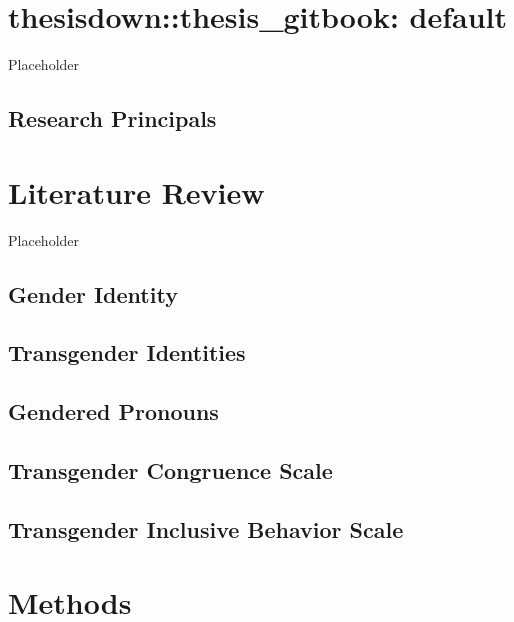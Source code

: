 \documentclass[12pt,twoside]{reedthesis}
\begin{document}
\hypertarget{thesisdownthesis_gitbook-default}{%
\chapter{thesisdown::thesis\_gitbook: default}\label{thesisdownthesis_gitbook-default}}

Placeholder

\hypertarget{research-principals}{%
\section{Research Principals}\label{research-principals}}

\hypertarget{literature-review}{%
\chapter{Literature Review}\label{literature-review}}

Placeholder

\hypertarget{gender-identity}{%
\section{Gender Identity}\label{gender-identity}}

\hypertarget{transgender-identities}{%
\section{Transgender Identities}\label{transgender-identities}}

\hypertarget{gendered-pronouns}{%
\section{Gendered Pronouns}\label{gendered-pronouns}}

\hypertarget{transgender-congruence-scale}{%
\section{Transgender Congruence Scale}\label{transgender-congruence-scale}}

\hypertarget{transgender-inclusive-behavior-scale}{%
\section{Transgender Inclusive Behavior Scale}\label{transgender-inclusive-behavior-scale}}

\hypertarget{methods}{%
\chapter{Methods}\label{methods}}
\end{document}
